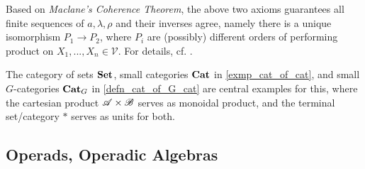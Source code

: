 \documentclass{article}
\begin{document}
Based on \emph{Maclane's Coherence Theorem}, the above two axioms guarantees all finite sequences of $a,\lambda,\rho$ and their inverses agree, namely there is a unique isomorphism $P_1\rightarrow P_2$, where $P_i$ are (possibly) different orders of performing product on $X_1,...,X_n\in\mathcal{V}$. For details, cf. \cite{M98}.

The category of sets $\mathbf{Set}$, small categories $\mathbf{Cat}$ in \ref{exmp_cat_of_cat}, and small $G$-categories $\mathbf{Cat}_G$ in \ref{defn_cat_of_G_cat} are central examples for this, where the cartesian product $\mathscr{A}\times\mathscr{B}$ serves as monoidal product, and the terminal set/category $*$ serves as units for both.

\hfil

\subsection{Operads, Operadic Algebras}\label{sub_operad}
\end{document}
